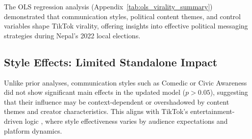 \documentclass[12pt,a4paper]{report}
\begin{document}

The OLS regression analysis (Appendix~\ref{tab:ols_virality_summary}) demonstrated that communication styles, political content themes, and control variables shape TikTok virality, offering insights into effective political messaging strategies during Nepal’s 2022 local elections.

\subsection*{Style Effects: Limited Standalone Impact}
Unlike prior analyses, communication styles such as Comedic or Civic Awareness did not show significant main effects in the updated model ($p > 0.05$), suggesting that their influence may be context-dependent or overshadowed by content themes and creator characteristics. This aligns with TikTok’s entertainment-driven logic \parencite{PeñaFernández2022}, where style effectiveness varies by audience expectations and platform dynamics.
\end{document}

